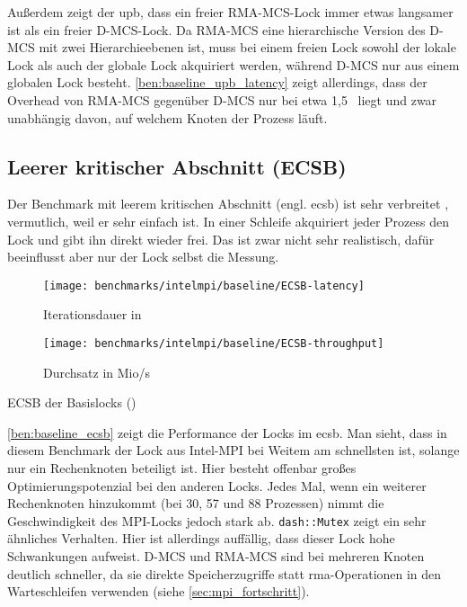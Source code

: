 Außerdem zeigt der \gls{upb},
dass ein freier RMA-MCS-Lock immer etwas langsamer ist
als ein freier D-MCS-Lock.
Da RMA-MCS eine hierarchische Version des D-MCS mit zwei Hierarchieebenen ist,
muss bei einem freien Lock sowohl der lokale Lock
als auch der globale Lock akquiriert werden,
während D-MCS nur aus einem globalen Lock besteht.
\autoref{ben:baseline_upb_latency} zeigt allerdings,
dass der Overhead
von RMA-MCS gegenüber D-MCS
nur bei etwa 1,5~ liegt und zwar unabhängig davon,
auf welchem Knoten der Prozess läuft.

\clearpage

\subsection{Leerer kritischer Abschnitt (ECSB)}
\label{sec:ecsb}

Der Benchmark mit leerem kritischen Abschnitt (engl. \gls{ecsb}) ist
sehr verbreitet \cite{RH-Lock} \cite{HCLH-Lock} \cite{FC-MCS-Lock} \cite{HMCS-Lock},
vermutlich, weil er sehr einfach ist.
In einer Schleife akquiriert jeder Prozess den Lock
und gibt ihn direkt wieder frei.
Das ist zwar nicht sehr realistisch,
dafür beeinflusst aber nur der Lock selbst die Messung.

\begin{benchmark}[h]
    \begin{subfigure}{.5\textwidth}
        \texttt{[image: benchmarks/intelmpi/baseline/ECSB-latency]}
        \caption{Iterationsdauer in }
        \label{ben:baseline_ecsb_latency}
    \end{subfigure}
    \begin{subfigure}{.5\textwidth}
        \texttt{[image: benchmarks/intelmpi/baseline/ECSB-throughput]}
        \caption{Durchsatz in Mio/s}
        \label{ben:baseline_ecsb_throughput}
    \end{subfigure}
    \caption{ECSB der Basislocks (\ecsburl)}
    \label{ben:baseline_ecsb}
\end{benchmark}

\autoref{ben:baseline_ecsb} zeigt die Performance der Locks im \gls{ecsb}.
Man sieht,
dass in diesem Benchmark der Lock aus Intel-MPI bei Weitem am schnellsten ist,
solange nur ein Rechenknoten beteiligt ist.
Hier besteht offenbar großes Optimierungspotenzial bei den anderen Locks.
Jedes Mal,
wenn ein weiterer Rechenknoten hinzukommt
(bei 30, 57 und 88 Prozessen)
nimmt die Geschwindigkeit des MPI-Locks jedoch stark ab.
\texttt{dash::Mutex} zeigt ein sehr ähnliches Verhalten.
Hier ist allerdings auffällig,
dass dieser Lock hohe Schwankungen aufweist.
D-MCS und RMA-MCS sind bei mehreren Knoten deutlich schneller,
da sie direkte Speicherzugriffe
statt \gls{rma}-Operationen in den Warteschleifen verwenden (siehe \autoref{sec:mpi_fortschritt}).

